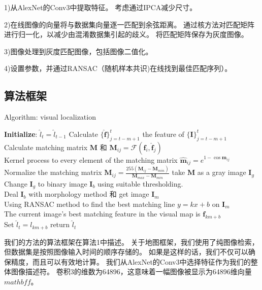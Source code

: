  1)从AlexNet的Conv3中提取特征。 考虑通过IPCA减少尺寸。

 2)在线图像的向量将与数据集向量逐一匹配到余弦距离。 通过核方法对匹配矩阵进行归一化，以减少由混淆数据集引起的歧义。 将匹配矩阵保存为灰度图像。

3)图像处理到灰度匹配图像，包括图像二值化。

 4)设置参数，并通过RANSAC（随机样本共识)在线找到最佳匹配序列）。


\subsection{算法框架}{}
\begin{algorithm} 
 \caption{Algorithm: visual localization}
 \textbf{Initialize}: $\hat{l}_t = \hat{l}_{t-1}$
  {       Calculate $\{\mathbf{\hat{f}}\}_{j=t-m+1}^{t}$ the feature of $\{\mathbf{I}\}_{j=t-m+1}^{t}$ \\
    Calculate matching matrix $\mathbf{M}$ 和 $\mathbf{M}_{ij}=\mathcal{F}(\mathbf{f}_i,\mathbf{\hat{f}}_j)$   \\
    Kernel process to every element of the matching matrix $\mathbf{\hat{m}}_{ij} = e^{1-\cos{\mathbf{m}_{ij}}}$
    \\
    Normalize the matching matrix $\mathbf{M}_{ij}=\frac{255\left(\mathbf{M}_{ij}-\mathbf{M}_{min}\right)}{\mathbf{M}_{max}-\mathbf{M}_{min}}$ take $\mathbf{M}$ as a gray image $\mathbf{I}_g$\\
    Change $\mathbf{I}_g$ to binary image $\mathbf{I}_b$ using suitable thresholding.\\
    Deal $\mathbf{I}_b$ with morphology method 和 get image $\mathbf{I}_m$\\
    Using RANSAC method to find the best matching line $y=kx+b$ on $\mathbf{I}_m$ \\
    The current image's best matching feature in the visual map is $\mathbf{f}_{km+b}$\\
    Set $\hat{l}_t = l_{km+b} $
 }
 return $\hat{l}_t$
  \label{alg:Algorithm}
\end{algorithm}

我们的方法的算法框架在算法1中描述。 关于地图框架，我们使用了纯图像检索，但数据集是按照图像输入时间的顺序存储的。 如果是这样的话，我们不仅可以确保精度，而且可以有效地计算。 我们从AlexNet的Conv3中选择特征作为我们的整体图像描述符。 卷积3的维数为64896，这意味着一幅图像被显示为64896维向量$mathbf{f}$。 

